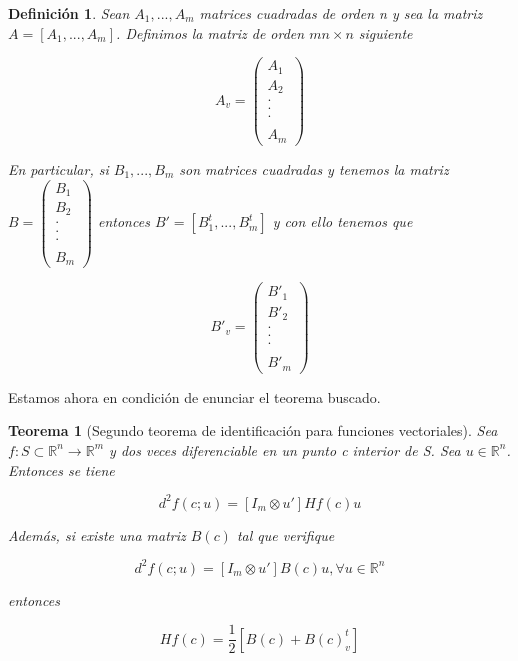 \documentclass{article}
\theoremstyle{theorem-style}  %
\newtheorem{theorem}{Teorema}[section]  %
\theoremstyle{definition-style}
\newtheorem{definition}{Definición}[section]
\theoremstyle{example-style}
\theoremstyle{exercise-style}
\begin{document}
	\begin{definition}
		Sean $A_1, ..., A_m$ matrices cuadradas de orden n y sea la matriz $A = [A_1, ..., A_m]$. Definimos la matriz de orden $mn \times n$ siguiente
		
		$$A_v = \left({\begin{array}{c}
			A_1\\
			A_2\\
			.\\
			.\\
			.\\
			\\
			A_m
			\end{array} } \right)$$
		
		En particular, si $B_1, ..., B_m$ son matrices cuadradas y tenemos la matriz $B = \left({\begin{array}{c}
			B_1\\
			B_2\\
			.\\
			.\\
			.\\
			\\
			B_m
			\end{array} } \right)$ entonces $B' = [B_1^t, ..., B_m^t]$ y con ello tenemos que
		
		$$ B'_v = \left({\begin{array}{c}
			B'_1\\
			B'_2\\
			.\\
			.\\
			.\\
			\\
			B'_m
			\end{array} } \right)$$
		
	\end{definition}
	
	Estamos ahora en condición de enunciar el teorema buscado.
	
	\begin{theorem}[Segundo teorema de identificación para funciones vectoriales]
		Sea $f: S \subset \mathbb{R}^n \rightarrow \mathbb{R}^m$ y dos veces diferenciable en un punto c interior de S. Sea $u \in \mathbb{R}^n$. Entonces se tiene
		
		$$d^2 f(c;u) = [I_m \otimes u'] H f(c) u$$
		
		Además, si existe una matriz $B(c)$ tal que verifique
		
		$$d^2 f(c;u) = [I_m \otimes u'] B(c) u, \forall u \in \mathbb{R}^n$$
		
		entonces
		
		$$Hf(c) = \frac{1}{2}[B(c) + B(c)^t_v]$$
		
	\end{theorem}
	
\end{document}

